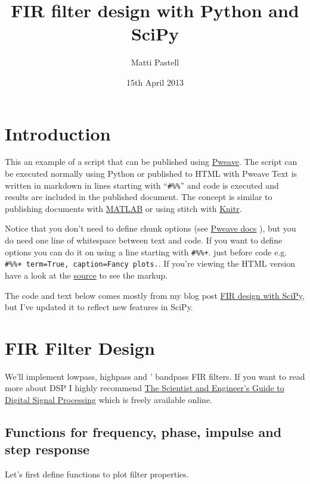 \documentclass[a4paper,11pt,final]{article}
\title{ FIR filter design with Python and SciPy}
\author{ Matti Pastell}
\date{ 15th April 2013}
\begin{document}
\maketitle
\section{Introduction}\label{introduction}

This an example of a script that can be published using
\href{http://mpastell.com/pweave}{Pweave}. The script can be executed
normally using Python or published to HTML with Pweave Text is written
in markdown in lines starting with ``\texttt{\#\%\%}'' and code is
executed and results are included in the published document. The concept
is similar to publishing documents with
\href{http://mathworks.com}{MATLAB} or using stitch with
\href{http://http://yihui.name/knitr/demo/stitch/}{Knitr}.

Notice that you don't need to define chunk options (see
\href{http://mpastell.com/pweave/usage.html\#code-chunk-options}{Pweave
docs} ), but you do need one line of whitespace between text and code.
If you want to define options you can do it on using a line starting
with \texttt{\#\%\%+}. just before code e.g.
\texttt{\#\%\%+\ term=True,\ caption=\textquotesingle{}Fancy\ plots.\textquotesingle{}}.
If you're viewing the HTML version have a look at the
\href{FIR_design.py}{source} to see the markup.

The code and text below comes mostly from my blog post
\href{http://mpastell.com/2010/01/18/fir-with-scipy/}{FIR design with
SciPy}, but I've updated it to reflect new features in SciPy.

\section{FIR Filter Design}\label{fir-filter-design}

We'll implement lowpass, highpass and ' bandpass FIR filters. If you
want to read more about DSP I highly recommend
\href{http://www.dspguide.com/}{The Scientist and Engineer's Guide to
Digital Signal Processing} which is freely available online.

\subsection{Functions for frequency, phase, impulse and step
response}\label{functions-for-frequency-phase-impulse-and-step-response}

Let's first define functions to plot filter properties.
\end{document}
